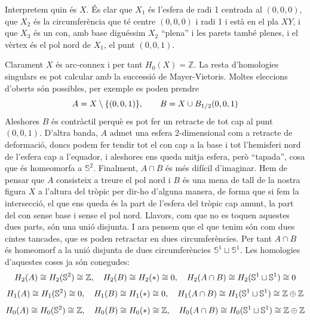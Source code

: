 \documentclass[../main.tex]{subfiles}
\begin{document}
\begin{sol}
Interpretem quin és $X$. És clar que $X_1$ és l'esfera de radi 1 centrada al $(0,0,0)$, que $X_2$ és la circumferència que té centre $(0,0,0)$ i radi 1 i està en el pla $XY$, i que $X_3$ és un con, amb base diguéssim $X_2$ ``plena'' i les parets també plenes, i el vèrtex és el pol nord de $X_1$, el punt $(0,0,1)$.

Clarament $X$ és arc-connex i per tant $H_0(X) = \mathbb{Z}$. La resta d'homologies singulars es pot calcular amb la successió de Mayer-Vietoris. Moltes eleccions d'oberts són possibles, per exemple es poden prendre
\begin{equation}
    \notag
    A = X\setminus\{(0,0,1)\},\qquad B = X\cup B_{1/2}(0,0,1)
\end{equation}
Aleshores $B$ és contràctil perquè es pot fer un retracte de tot cap al punt $(0,0,1)$. D'altra banda, $A$ admet una esfera 2-dimensional com a retracte de deformació, doncs podem fer tendir tot el con cap a la base i tot l'hemisferi nord de l'esfera cap a l'equador, i aleshores ens queda mitja esfera, però ``tapada'', cosa que és homeomorfa a $\mathbb{S}^2$. Finalment, $A\cap B$ és més difícil d'imaginar. Hem de pensar que $A$ consisteix a treure el pol nord i $B$ és una mena de tall de la nostra figura $X$ a l'altura del tròpic per dir-ho d'alguna manera, de forma que si fem la intersecció, el que ens queda és la part de l'esfera del tròpic cap amunt, la part del con sense base i sense el pol nord. Llavors, com que no es toquen aquestes dues parts, són una unió disjunta. I ara pensem que el que tenim són com dues cintes tancades, que es poden retractar en dues circumferències. Per tant $A\cap B$ és homeomorf a la unió disjunta de dues circumferències $\mathbb{S}^1\sqcup\mathbb{S}^1$. Les homologies d'aquestes coses ja són conegudes:
\begin{equation}
    \notag
    H_2(A)\cong H_2(\mathbb{S}^2)\cong\mathbb{Z},\quad H_2(B)\cong H_2(*)\cong 0,\quad H_2(A\cap B)\cong H_2(\mathbb{S}^1\sqcup\mathbb{S}^1)\cong 0
\end{equation}
\begin{equation}
    \notag
    H_1(A)\cong H_1(\mathbb{S}^2)\cong0,\quad H_1(B)\cong H_1(*)\cong0,\quad H_1(A\cap B)\cong H_1(\mathbb{S}^1\sqcup\mathbb{S}^1)\cong \mathbb{Z}\oplus\mathbb{Z}
\end{equation}
\begin{equation}
    \notag
    H_0(A)\cong H_0(\mathbb{S}^2)\cong\mathbb{Z},\quad H_0(B)\cong H_0(*)\cong \mathbb{Z},\quad H_0(A\cap B)\cong H_0(\mathbb{S}^1\sqcup\mathbb{S}^1)\cong \mathbb{Z}\oplus\mathbb{Z}

\end{equation}
\end{sol}
\end{document}
